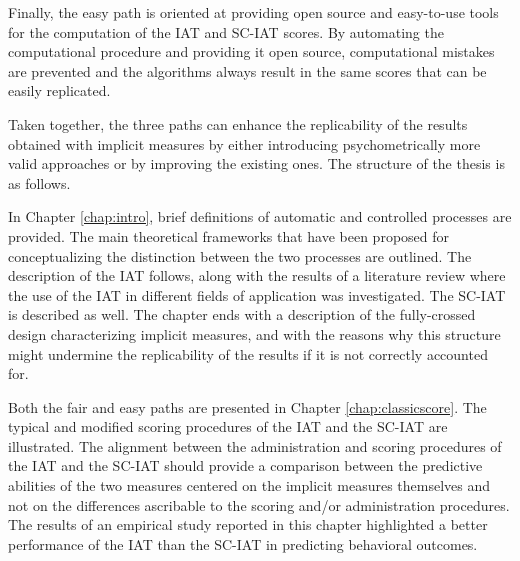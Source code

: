 \documentclass[12pt]{book}
\begin{document}
Finally, the easy path is oriented at providing open source and easy-to-use tools for the computation of the IAT and SC-IAT scores. By automating the computational procedure and providing it open source, computational mistakes are prevented and the algorithms always result in the same scores that can be easily replicated. %

Taken together, the three paths can enhance the replicability of the results obtained with implicit measures by either introducing psychometrically more valid approaches or by improving the existing ones. The structure of the thesis is as follows.

	In Chapter \ref{chap:intro}, brief definitions of automatic and controlled processes are provided. The main theoretical frameworks that have been proposed for conceptualizing the distinction between the two processes are outlined.  
	The description of the IAT follows, along with the results of a literature review where the use of the IAT in different fields of application was investigated. 
	The SC-IAT is described as well.  
	The chapter ends with a description of the fully-crossed design characterizing implicit measures, and with the reasons why this structure might undermine the replicability of the results if it is not correctly accounted for. 
	
	Both the fair and easy paths are presented in Chapter \ref{chap:classicscore}.  
	The typical and modified scoring procedures of the IAT and the SC-IAT are illustrated.
	The alignment between the administration and scoring procedures of the IAT and the SC-IAT should provide a comparison between the predictive abilities of the two measures  centered on the implicit measures themselves and not on the differences ascribable to the scoring and/or administration procedures.
	The results of an empirical study reported in this chapter highlighted a better performance of the IAT than the SC-IAT in predicting behavioral outcomes. 
\end{document}
